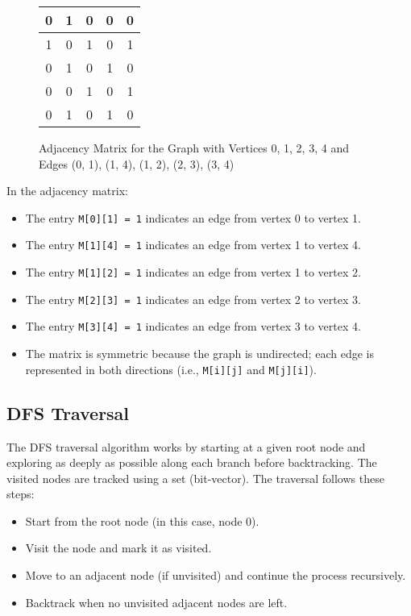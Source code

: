 \documentclass{book}
\begin{document}
\begin{figure}[h!]
    \centering
    \begin{tabular}{|c|c|c|c|c|}
    \hline
    0 & 1 & 0 & 0 & 0 \\
    \hline
    1 & 0 & 1 & 0 & 1 \\
    \hline
    0 & 1 & 0 & 1 & 0 \\
    \hline
    0 & 0 & 1 & 0 & 1 \\
    \hline
    0 & 1 & 0 & 1 & 0 \\
    \hline
    \end{tabular}
    \caption{Adjacency Matrix for the Graph with Vertices 0, 1, 2, 3, 4 and Edges (0, 1), (1, 4), (1, 2), (2, 3), (3, 4)}
\end{figure}

In the adjacency matrix:
\begin{itemize}
    \item The entry \texttt{M[0][1] = 1} indicates an edge from vertex 0 to vertex 1.
    \item The entry \texttt{M[1][4] = 1} indicates an edge from vertex 1 to vertex 4.
    \item The entry \texttt{M[1][2] = 1} indicates an edge from vertex 1 to vertex 2.
    \item The entry \texttt{M[2][3] = 1} indicates an edge from vertex 2 to vertex 3.
    \item The entry \texttt{M[3][4] = 1} indicates an edge from vertex 3 to vertex 4.
    \item The matrix is symmetric because the graph is undirected; each edge is represented in both directions (i.e., \texttt{M[i][j]} and \texttt{M[j][i]}).
\end{itemize}

\subsection{DFS Traversal}

The DFS traversal algorithm works by starting at a given root node and exploring as deeply as possible along each branch before backtracking. The visited nodes are tracked using a set (bit-vector). The traversal follows these steps:
\begin{itemize}
    \item Start from the root node (in this case, node 0).
    \item Visit the node and mark it as visited.
    \item Move to an adjacent node (if unvisited) and continue the process recursively.
    \item Backtrack when no unvisited adjacent nodes are left.
\end{itemize}
\end{document}
